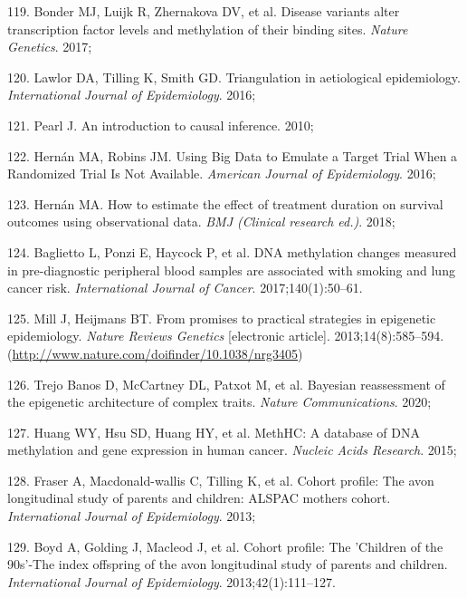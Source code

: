 \documentclass[11pt,oneside]{bristolthesis}
\newenvironment{cslreferences}%
  {}%
  {\par}
\begin{document}
\begin{cslreferences}
\leavevmode\hypertarget{ref-Bonder2017}{}%
119. Bonder MJ, Luijk R, Zhernakova DV, et al. Disease variants alter transcription factor levels and methylation of their binding sites. \emph{Nature Genetics}. 2017;

\leavevmode\hypertarget{ref-Lawlor2016}{}%
120. Lawlor DA, Tilling K, Smith GD. Triangulation in aetiological epidemiology. \emph{International Journal of Epidemiology}. 2016;

\leavevmode\hypertarget{ref-Pearl2010}{}%
121. Pearl J. An introduction to causal inference. 2010;

\leavevmode\hypertarget{ref-Hernan2016}{}%
122. Hernán MA, Robins JM. Using Big Data to Emulate a Target Trial When a Randomized Trial Is Not Available. \emph{American Journal of Epidemiology}. 2016;

\leavevmode\hypertarget{ref-Hernan2018}{}%
123. Hernán MA. How to estimate the effect of treatment duration on survival outcomes using observational data. \emph{BMJ (Clinical research ed.)}. 2018;

\leavevmode\hypertarget{ref-Baglietto2017}{}%
124. Baglietto L, Ponzi E, Haycock P, et al. DNA methylation changes measured in pre-diagnostic peripheral blood samples are associated with smoking and lung cancer risk. \emph{International Journal of Cancer}. 2017;140(1):50--61.

\leavevmode\hypertarget{ref-Mill2013}{}%
125. Mill J, Heijmans BT. From promises to practical strategies in epigenetic epidemiology. \emph{Nature Reviews Genetics} {[}electronic article{]}. 2013;14(8):585--594. (\url{http://www.nature.com/doifinder/10.1038/nrg3405})

\leavevmode\hypertarget{ref-TrejoBanos2020}{}%
126. Trejo Banos D, McCartney DL, Patxot M, et al. Bayesian reassessment of the epigenetic architecture of complex traits. \emph{Nature Communications}. 2020;

\leavevmode\hypertarget{ref-Huang2015}{}%
127. Huang WY, Hsu SD, Huang HY, et al. MethHC: A database of DNA methylation and gene expression in human cancer. \emph{Nucleic Acids Research}. 2015;

\leavevmode\hypertarget{ref-Fraser2013}{}%
128. Fraser A, Macdonald-wallis C, Tilling K, et al. Cohort profile: The avon longitudinal study of parents and children: ALSPAC mothers cohort. \emph{International Journal of Epidemiology}. 2013;

\leavevmode\hypertarget{ref-Boyd2013}{}%
129. Boyd A, Golding J, Macleod J, et al. Cohort profile: The 'Children of the 90s'-The index offspring of the avon longitudinal study of parents and children. \emph{International Journal of Epidemiology}. 2013;42(1):111--127.


\end{cslreferences}
\end{document}
